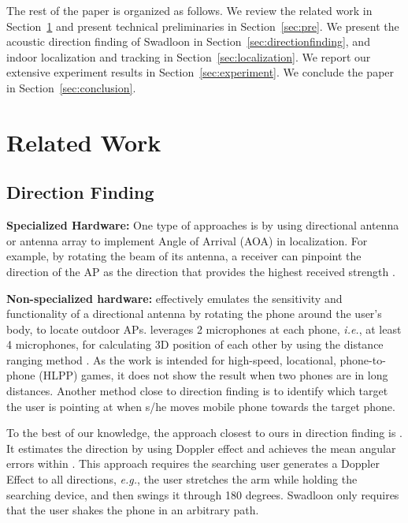 \documentclass[]{sig-alternate-10pt}
\def\ie{\textit{i.e.}\xspace}
\def\eg{\textit{e.g.}\xspace}
\def \ourprotocol{Swadloon\xspace}
\begin{document}
The rest of the paper is organized as follows.
We review the related work in Section~\ref{sec:related} and
 present technical preliminaries in Section~\ref{sec:pre}.
We present the acoustic direction finding of \ourprotocol in
 Section~\ref{sec:directionfinding},
 and indoor localization and tracking in
 Section~\ref{sec:localization}.
We report our extensive experiment
results in Section~\ref{sec:experiment}.
We conclude the paper in Section~\ref{sec:conclusion}.

\section{Related Work}
\label{sec:related}

\subsection{Direction Finding}

\noindent\textbf{Specialized Hardware:}  
One type of approaches is by using directional antenna
\cite{4711074,4509717,Niculescu:2004:VBS:1023720.1023727} or antenna array \cite{DBLP:journals/cee/KulakowskiVELG10} to implement Angle of Arrival (AOA) \cite{2003-INFOCOM-AdHocPositioning} in localization.  For
example, by rotating the beam of its antenna, a receiver can pinpoint
the direction of the AP as the direction that provides the highest
received strength \cite{4509717}.

\noindent\textbf{Non-specialized hardware:}
 \cite{2011-MOBICOM-Iamantenna} effectively emulates the
sensitivity and functionality of a directional antenna by rotating the
phone around the user's body, to locate outdoor APs. \cite{2011-SenSys-feasibilityrealtime}
leverages 2 microphones at each phone, \ie, at least 4 microphones,
for calculating 3D position of each other by using the distance
ranging method \cite{2007-SenSys-BeepBeephighaccuracy}. As the work is
intended for high-speed, locational, phone-to-phone (HLPP) games, it does not show the result when two phones are in long distances. Another
method \cite{2009-MobiSys-Point&Connectintentionbased} close to
direction finding is to identify which target the user is pointing at
when s/he moves mobile phone towards the target phone. 

To the best of our knowledge, the approach closest to ours in
direction finding is 
\cite{2012-MobiQuitous2011-ProposalDirectionEstimation}. It  
estimates the direction by using Doppler effect and achieves the mean angular errors within . This approach
requires the searching user generates a Doppler Effect to all
directions, \eg, the user stretches the arm while holding the
searching device, and then swings it through 180 degrees. \ourprotocol only requires that the user shakes the phone in an
arbitrary path. 
\end{document}
